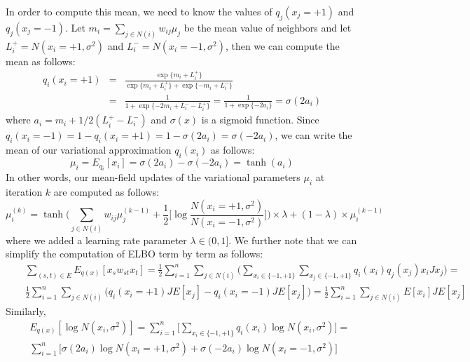 In order to compute this mean, we need to know the values of $q_j(x_j=+1)$ and $q_j(x_j=-1)$. Let $m_i = \sum_{j\in N(i)}w_{ij}\mu_j$ be the mean value of neighbors and let $L_{i}^{+} = N(x_i=+1,\sigma^2)$ and $L_{i}^{-} = N(x_i=-1, \sigma^2)$, then we can compute the mean as follows:
\begin{eqnarray}
    q_i(x_i=+1) &=& \frac{\exp \{m_i + L_{i}^{+}\}}{\exp \{m_i + L_{i}^{+}\} + \exp \{-m_i + L_{i}^{-}\}} \\
    &=& \frac{1}{1+\exp \{-2m_i + L_{i}^{-} - L_{i}^{+}\}} = \frac{1}{1+\exp \{-2a_i\}} = \sigma(2a_i)
\end{eqnarray}
where $a_i = m_i + 1/2(L_{i}^{+} - L_{i}^{-})$ and $\sigma(x)$ is a sigmoid function. Since $q_i(x_i=-1) = 1-q_i(x_i=+1)=1-\sigma(2a_i)=\sigma(-2a_i)$, we can write the mean of our variational approximation $q_i(x_i)$ as follows:
\begin{equation}
   \mu_i = E_{q_i}[x_i] = \sigma(2a_i) - \sigma(-2a_i) = \tanh(a_i)
\end{equation}
In other words, our mean-field updates of the variational parameters $\mu_i$ at iteration $k$ are computed as follows:
\begin{equation}
    \mu_{i}^{(k)} = \tanh \bigg(\sum_{j\in N(i)}w_{ij}\mu_{j}^{(k-1)} + \frac{1}{2}\bigg[\log \frac{N(x_i=+1,\sigma^2)}{N(x_i=-1,\sigma^2)} \bigg] \bigg)\times \lambda + (1-\lambda)\times \mu_{i}^{(k-1)}
\end{equation}
where we added a learning rate parameter $\lambda \in (0, 1]$. We further note that we can simplify the computation of ELBO term by term as follows:
\begin{eqnarray}
  && \sum_{(s,t)\in E} E_{q(x)}[x_s w_{st} x_t] = \frac{1}{2}\sum_{i=1}^{n}\sum_{j\in N(i)}\bigg(\sum_{x_i \in \{-1,+1\}} \sum_{x_j \in \{-1,+1\}}q_i(x_i)q_j(x_j)x_i J x_j \bigg) = \\
  && \frac{1}{2}\sum_{i=1}^{n}\sum_{j\in N(i)}\bigg(q_i(x_i=+1)JE[x_j] - q_i(x_i=-1)JE[x_j]\bigg) = \frac{1}{2}\sum_{i=1}^{n}\sum_{j \in N(i)} E[x_i] J E[x_j] 
\end{eqnarray}
Similarly,
\begin{eqnarray}
 && E_{q(x)}[\log N(x_i, \sigma^2)] = \sum_{i=1}^{n}\bigg[\sum_{x_i \in \{-1,+1\}}q_i(x_i)\log N(x_i,\sigma^2) \bigg] = \\
 && \sum_{i=1}^{n}\bigg[\sigma(2a_i)\log N(x_i=+1,\sigma^2)+\sigma(-2a_i)\log N(x_i=-1,\sigma^2) \bigg]
\end{eqnarray}

